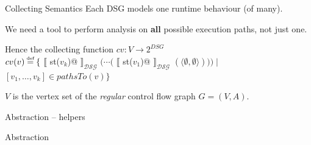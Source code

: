 \documentclass[xcolor={usenames,dvipsnames}]{beamer}
\makeatletter
\newcommand\defeq{\stackrel{\mathclap{\tiny\mbox{def}}}{=}}
\newcommand{\transformer}[2]{$\llbracket$ \lstinline@#1@
  $\rrbracket_{\mathcal{#2}}$}
\newcommand{\transformerDSG}[1]{\transformer{#1}{DSG}}
\makeatother
\begin{document}
\begin{frame}[fragile]{Collecting Semantics}
  Each DSG models one runtime behaviour (of many).

  \vspace{1em}

  We need a tool to perform analysis on \textbf{all} possible execution paths, not just one.

  \vspace{2em}

  Hence the collecting function $cv: V \to 2^{DSG}$ \\
  $cv(v) \defeq \{ $ \transformerDSG{st($v_k$)} $ ( \cdots ( $ \transformerDSG{st($v_1$)} $ ( \langle \emptyset, \emptyset \rangle ))) \mid $ \\
  \hspace{16em} $ \left[ v_1, \ldots, v_k \right] \in pathsTo(v) \} $

  \vspace{2em}

  $V$ is the vertex set of the \textit{regular} control flow graph $G = (V, A)$.
\end{frame}


\begin{frame}{Abstraction -- helpers}
\end{frame}

\begin{frame}{Abstraction}
\end{frame}
\end{document}
